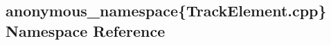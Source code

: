 \hypertarget{namespaceanonymous__namespace_02TrackElement_8cpp_03}{}\subsection{anonymous\+\_\+namespace\{Track\+Element.\+cpp\} Namespace Reference}
\label{namespaceanonymous__namespace_02TrackElement_8cpp_03}
